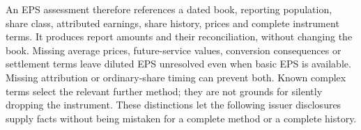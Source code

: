 An EPS assessment therefore references a dated book, reporting population,
share class, attributed earnings, share history, prices and complete
instrument terms. It produces report amounts and their reconciliation,
without changing the book. Missing average prices, future-service values,
conversion consequences or settlement terms leave diluted EPS unresolved
even when basic EPS is available. Missing attribution or ordinary-share
timing can prevent both. Known complex terms select the relevant further
method; they are not grounds for silently dropping the instrument.
These distinctions let the following issuer disclosures supply facts
without being mistaken for a complete method or a complete history.
